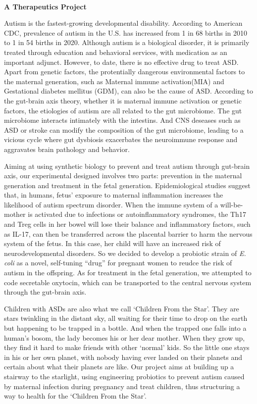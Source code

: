 \textbf{\\A Therapeutics Project\\}\begin{spacing}{1.5}

Autism is the fastest-growing developmental disability. According to American CDC, prevalence of autism in the U.S. has increased from 1 in 68 births in 2010 to 1 in 54 births in 2020. Although autism is a biological disorder, it is primarily treated through education and behavioral services, with medication as an important adjunct. However, to date, there is no effective drug to treat ASD. Apart from genetic factors, the protentially dangerous environmental factors to the maternal generation, such as Maternal immune activation(MIA) and Gestational diabetes mellitus (GDM), can also be the cause of ASD. According to the gut-brain axis theory, whether it is maternal immune activation or genetic factors, the etiologies of autism are all related to the gut microbiome. The gut microbiome interacts intimately with the intestins. And CNS deseases such as ASD or stroke can modify the composition of the gut microbiome, leading to a vicious cycle where gut dysbiosis exacerbates the neuroimmune response and aggravates brain pathology and behavior.

Aiming at using synthetic biology to prevent and treat autism through gut-brain axis, our experimental designed involves two parts: prevention in the maternal generation and treatment in the fetal generation. Epidemiological studies suggest that, in humans, fetus' exposure to maternal inflammation increases the likelihood of autism spectrum disorder. When the immune system of a will-be-mother is activated due to infections or autoinflammatory syndromes, the Th17 and Treg cells in her bowel will lose their balance and inflammatory factors, such as IL-17, can then be transferred across the placental barrier to harm the nervous system of the fetus. In this case, her child will have an increased risk of neurodevelopmental disorders. So we decided to develop a probiotic strain of \textit{E. coli} as a novel, self-tuning “drug” for pregnant women to reudce the risk of autism in the offspring. As for treatment in the fetal generation, we attempted to code secretable oxytocin, which can be transported to the central nervous system through the gut-brain axis.

Children with ASDs are also what we call ‘Children From the Star’. They are stars twinkling in the distant sky, all waiting for their time to drop on the earth but happening to be trapped in a bottle. And when the trapped one falls into a human's bosom, the lady becomes his or her dear mother. When they grow up, they find it hard to make friends with other ‘normal’ kids. So the little one stays in his or her own planet, with nobody having ever landed on their planets and certain about what their planets are like. Our project aims at building up a stairway to the starlight, using engineering probiotics to prevent autism caused by maternal infection during pregnancy and treat children, thus structuring a way to health for the ‘Children From the Star’.\end{spacing}
\\

